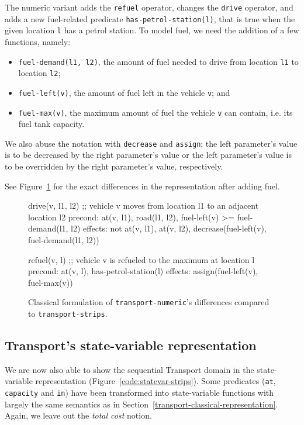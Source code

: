 The numeric variant  adds the \verb+refuel+ operator, changes the \verb+drive+
operator, and adds a new fuel-related predicate \verb+has-petrol-station(l)+, that is true when the given location \verb+l+ has
a petrol station.
To model fuel, we need the addition of a few functions, namely:

\begin{itemize}
\item \verb+fuel-demand(l1, l2)+, the amount of fuel needed to drive
from location \verb+l1+ to location \verb+l2+;
\item \verb+fuel-left(v)+, the amount of fuel left in
the vehicle \verb+v+; and
\item \verb+fuel-max(v)+, the maximum amount of fuel
the vehicle \verb+v+ can contain, i.e. its fuel tank capacity.
\end{itemize}



We also abuse the notation with \verb+decrease+ and \verb+assign+;
the left parameter's value is to be decreased by the right
parameter's value or the left parameter's value is to be overridden
by the right parameter's value, respectively.

See Figure~\ref{code:classical-numeric} for the exact differences
in the representation after adding fuel.

\begin{figure}[tbp]
\begin{code}
drive(v, l1, l2)
  ;; vehicle v moves from location l1 to an adjacent location l2
  precond: at(v, l1), road(l1, l2), fuel-left(v) >= fuel-demand(l1, l2)
  effects: not at(v, l1), at(v, l2),
           decrease(fuel-left(v),  fuel-demand(l1, l2))
  
refuel(v, l)
  ;; vehicle v is refueled to the maximum at location l
  precond: at(v, l), has-petrol-station(l)
  effects: assign(fuel-left(v), fuel-max(v))
\end{code}
\caption[Partial classical formulation of \texttt{transport-numeric}.]{Classical formulation of \texttt{transport-numeric}'s differences compared to \texttt{transport-strips}.}
\label{code:classical-numeric}
\end{figure}

\subsection{Transport's state-variable representation}

We are now also able to show the sequential Transport domain
in the state-variable representation (Figure~\ref{code:statevar-strips}).
Some predicates (\verb+at+, \verb+capacity+ and \verb+in+) have been transformed
into state-variable functions with largely the same semantics as in
Section~\ref{transport-classical-representation}. Again, we leave out
the \textit{total cost} notion.

